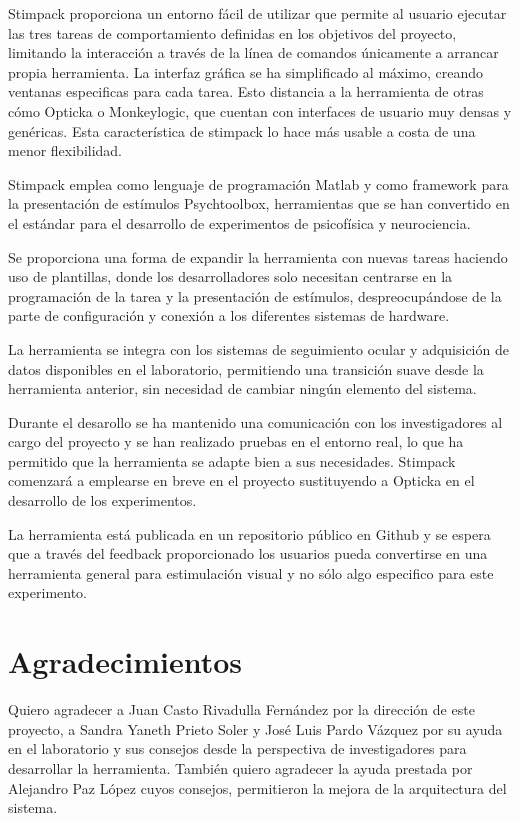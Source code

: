 \documentclass[conference]{IEEEtran}
\begin{document}
Stimpack proporciona un entorno fácil de utilizar que permite al usuario ejecutar las tres tareas de comportamiento definidas en los objetivos del proyecto, limitando la interacción a través de la línea de comandos únicamente a arrancar propia herramienta. La interfaz gráfica se ha simplificado al máximo, creando ventanas especificas para cada tarea. Esto distancia a la herramienta de otras cómo Opticka o Monkeylogic, que cuentan con interfaces de usuario muy densas y genéricas. Esta característica de stimpack lo hace más usable a costa de una menor flexibilidad.

Stimpack emplea como lenguaje de programación Matlab y como framework para la presentación de estímulos Psychtoolbox, herramientas que se han convertido en el estándar para el desarrollo de experimentos de psicofísica y neurociencia.

Se proporciona una forma de expandir la herramienta con nuevas tareas haciendo uso de plantillas, donde los desarrolladores solo necesitan centrarse en la programación de la tarea y la presentación de estímulos, despreocupándose de la parte de configuración y conexión a los diferentes sistemas de hardware.

La herramienta se integra con los sistemas de seguimiento ocular y adquisición de datos disponibles en el laboratorio, permitiendo una transición suave desde la herramienta anterior, sin necesidad de cambiar ningún elemento del sistema.

Durante el desarollo se ha mantenido una comunicación con los investigadores al cargo del proyecto y se han realizado pruebas en el entorno real, lo que ha permitido que la herramienta se adapte bien a sus necesidades. Stimpack comenzará a emplearse en breve en el proyecto sustituyendo a Opticka en el desarrollo de los experimentos.

La herramienta está publicada en un repositorio público en Github\cite{stimpackrepo} y se espera que a través del feedback proporcionado los usuarios pueda convertirse en una herramienta general para estimulación visual y no sólo algo especifico para este experimento.

\section{Agradecimientos}

Quiero agradecer a Juan Casto Rivadulla Fernández por la dirección de este proyecto, a Sandra Yaneth Prieto Soler y José Luis Pardo Vázquez por su ayuda en el laboratorio y sus consejos desde la perspectiva de investigadores para desarrollar la herramienta. 
También quiero agradecer la ayuda prestada por Alejandro Paz López cuyos consejos, permitieron la mejora de la arquitectura del sistema.
\end{document}
